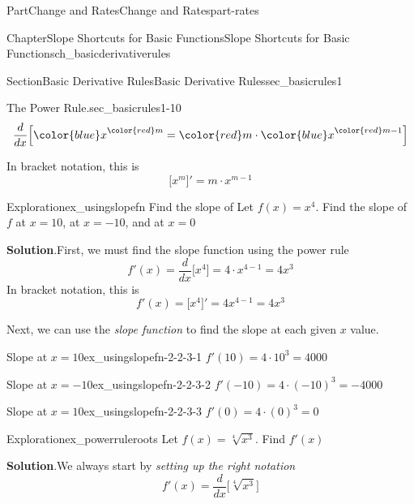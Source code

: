 \documentclass{tufte-book}
\newcommand{\blocktitlefont}{\relax}
\numberwithin{equation}{chapter}
\newcommand{\ddx}[1]{ \dfrac{d}{dx} \Big[ #1 \Big]  }
\newcommand{\D}[1]{ \Big[ #1 \Big]'  }
\begin{document}
\begin{partptx}{Part}{Change and Rates}{}{Change and Rates}{}{}{part-rates}
\begin{chapterptx}{Chapter}{Slope Shortcuts for Basic Functions}{}{Slope Shortcuts for Basic Functions}{}{}{ch_basicderivativerules}
\begin{sectionptx}{Section}{Basic Derivative Rules}{}{Basic Derivative Rules}{}{}{sec_basicrules1}
\begin{paragraphs}{The Power Rule.}{sec_basicrules1-10}
\begin{equation*}
\dfrac{d}{dx}\Big[   {\color{blue} x}^{\color{red} m}= {\color{red} m} \cdot {\color{blue} x}^{{\color{red} m}-1} \Big] 
\end{equation*}
%
\par
In bracket notation, this is%
\begin{equation*}
\D{x^m} = m \cdot x^{m-1}
\end{equation*}
%
\end{paragraphs}%
\begin{exploration}{Exploration}{}{ex_usingslopefn}%
Find the slope of Let \(f(x) = x^4\).  Find the slope of \(f\) at \(x=10\), at \(x=-10\), and at \(x=0\)%
\par\smallskip%
\noindent\textbf{\blocktitlefont Solution}.\hypertarget{ex_usingslopefn-2}{}\quad{}First, we must find the slope function using the power rule%
\begin{equation*}
f'(x) = \ddx{x^4} = 4 \cdot x^{4-1} = 4 x^3
\end{equation*}
In bracket notation, this is%
\begin{equation*}
f'(x) = \D{x^4} = 4 x^{4-1} = 4x^3
\end{equation*}
%
\par
Next, we can use the  \emph{slope function} to find the slope at each given \(x\) value.%
\begin{descriptionlist}
\begin{dlimedium}{Slope at \(x=10\)}{ex_usingslopefn-2-2-3-1}%
\(\displaystyle f'(10) = 4 \cdot 10^3 = 4000 \)%
\end{dlimedium}%
\begin{dlimedium}{Slope at \(x=-10\)}{ex_usingslopefn-2-2-3-2}%
\(\displaystyle f'(-10) = 4 \cdot (-10)^3 = -4000 \)%
\end{dlimedium}%
\begin{dlimedium}{Slope at \(x=10\)}{ex_usingslopefn-2-2-3-3}%
\(\displaystyle f'(0) = 4 \cdot (0)^3 = 0 \)%
\end{dlimedium}%
\end{descriptionlist}
%
\end{exploration}%
\begin{exploration}{Exploration}{}{ex_powerruleroots}%
Let \(f(x) = \sqrt[4]{x^3} \). Find \(f'(x)\)%
\par\smallskip%
\noindent\textbf{\blocktitlefont Solution}.\hypertarget{ex_powerruleroots-2}{}\quad{}We always start by \emph{setting up the right notation}%
\begin{equation*}
f'(x) = \dfrac{d}{dx}\Big[  \sqrt[4]{x^3} \Big]
\end{equation*}

\end{exploration}
\end{sectionptx}
\end{chapterptx}
\end{partptx}
\end{document}
